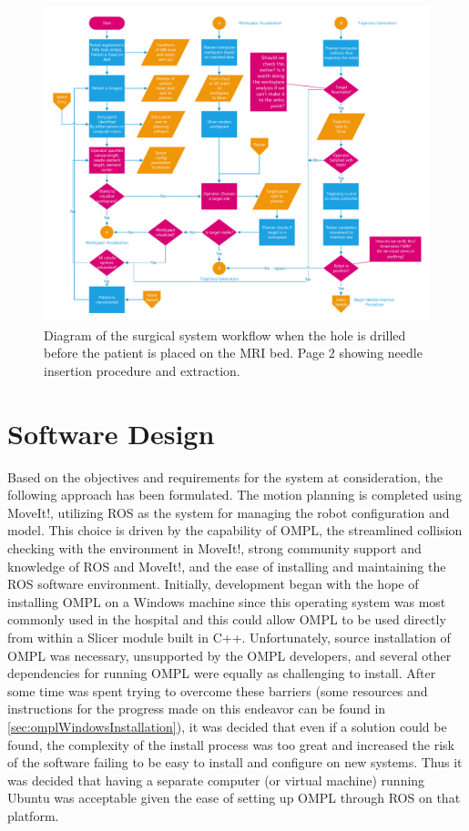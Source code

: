 \documentclass[12pt]{report}
\begin{document}
\begin{figure}[thpb]
	\centering
    \includegraphics[page=2,width=5in]{diagrams/Surgical_Workflow_-_Hole_Predrilled.pdf}
    \caption{Diagram of the surgical system workflow when the hole is drilled before the patient is placed on the MRI bed. Page 2 showing needle insertion procedure and extraction.}
    \label{fig:surgicalWorkflowPg2}
\end{figure}


\section{Software Design}
Based on the objectives and requirements for the system at consideration, the following approach has been formulated. The motion planning is completed using MoveIt!, utilizing ROS as the system for managing the robot configuration and model. This choice is driven by the capability of OMPL, the streamlined collision checking with the environment in MoveIt!, strong community support and knowledge of ROS and MoveIt!, and the ease of installing and maintaining the ROS software environment. Initially, development began with the hope of installing OMPL on a Windows machine since this operating system was most commonly used in the hospital and this could allow OMPL to be used directly from within a Slicer module built in C++. Unfortunately, source installation of OMPL was necessary, unsupported by the OMPL developers, and several other dependencies for running OMPL were equally as challenging to install. After some time was spent trying to overcome these barriers (some resources and instructions for the progress made on this endeavor can be found in \autoref{sec:omplWindowsInstallation}), it was decided that even if a solution could be found, the complexity of the install process was too great and increased the risk of the software failing to be easy to install and configure on new systems. Thus it was decided that having a separate computer (or virtual machine) running Ubuntu was acceptable given the ease of setting up OMPL through ROS on that platform. 
\end{document}
